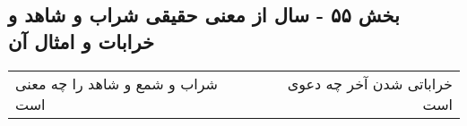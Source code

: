 \begin{center}
\section*{بخش ۵۵ - سال از معنی حقیقی شراب و شاهد و خرابات و امثال آن}
\label{sec:sh055}
\begin{longtable}{l p{0.5cm} r}
شراب و شمع و شاهد را چه معنی است
&&
خراباتی شدن آخر چه دعوی است
\\
\end{longtable}
\end{center}
